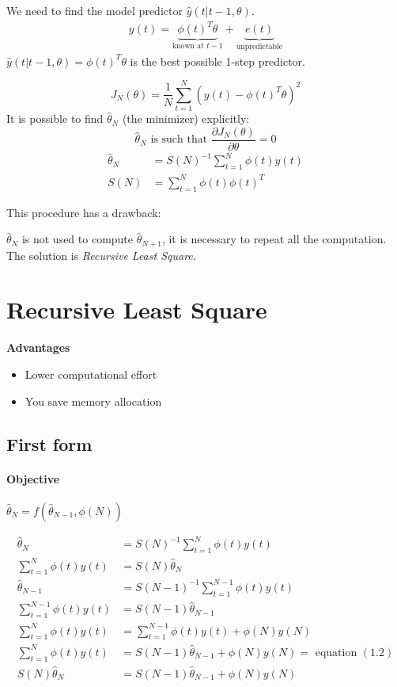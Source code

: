 We need to find the model predictor $\hat{y}(t|t-1, \theta)$.
\begin{align*}
    y(t) = \underbrace{\phi(t)^T\theta}_{\text{known at $t-1$}} + \underbrace{e(t)}_\text{unpredictable}
\end{align*}
$\hat{y}(t|t-1, \theta) = \phi(t)^T\theta$ is the best possible 1-step predictor.

\[
    J_N(\theta) = \frac{1}{N}\sum_{t=1}^N \left( y(t) - \phi(t)^T\theta \right)^2
\]
It is possible to find $\hat{\theta}_N$ (the minimizer) explicitly:
\[
    \hat{\theta}_N\text{ is such that } \frac{\partial J_N(\theta)}{\partial \theta} = 0
\]
\begin{align*}
    \hat{\theta}_N &= S(N)^{-1} \sum_{t=1}^N \phi(t)y(t) \\
    S(N) &= \sum_{t=1}^{N} \phi(t)\phi(t)^T
\end{align*}

This procedure has a drawback:

$\hat{\theta}_N$ is not used to compute $\hat{\theta}_{N+1}$, it is necessary to repeat all the computation.
The solution is \emph{Recursive Least Square}.

\section{Recursive Least Square}


\textbf{Advantages}
\begin{itemize}
    \item Lower computational effort
    \item You save memory allocation
\end{itemize}

\subsection{First form}

\paragraph{Objective} $\hat{\theta}_N = f(\hat{\theta}_{N-1}, \phi(N))$

\begin{align}
    \hat{\theta}_N &= S(N)^{-1} \sum_{t=1}^N \phi(t)y(t) \\
    \sum_{t=1}^N \phi(t)y(t) &= S(N)\hat{\theta}_N \\
    \hat{\theta}_{N-1} &= S(N-1)^{-1} \sum_{t=1}^{N-1} \phi(t)y(t) \\
    \sum_{t=1}^{N-1} \phi(t)y(t) &= S(N-1)\hat{\theta}_{N-1} \\
    \sum_{t=1}^{N} \phi(t)y(t) &= \sum_{t=1}^{N-1} \phi(t)y(t) + \phi(N)y(N) \\
    \sum_{t=1}^{N} \phi(t)y(t) &= S(N-1)\hat{\theta}_{N-1} + \phi(N)y(N) = \text{ equation } (1.2) \\
    S(N) \hat{\theta}_N &= S(N-1) \hat{\theta}_{N-1} + \phi(N)y(N)
\end{align}

